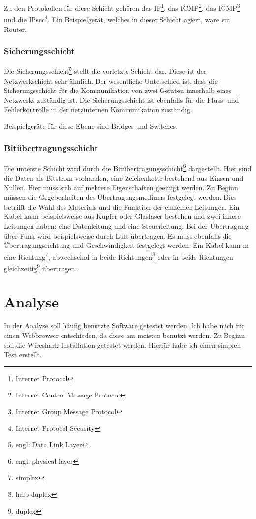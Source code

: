 \documentclass[12pt]{article}
\begin{document}
	Zu den Protokollen für diese Schicht gehören das IP\footnote{Internet Protocol}, das ICMP\footnote{Internet Control Message Protocol}, das IGMP\footnote{Internet Group Message Protocol} und die IPsec\footnote{Internet Protocol Security}. Ein Beispielgerät, welches in dieser Schicht agiert, wäre ein Router.\cite{osi-schichten-cloudflare}\cite{osi-schichten-netzwerkecom}
	
\subsubsection{Sicherungsschicht}
	Die Sicherungsschicht\footnote{engl: Data Link Layer} stellt die vorletzte Schicht dar. Diese ist der Netzwerkschicht sehr ähnlich. Der wesentliche Unterschied ist, dass die Sicherungsschicht für die Kommunikation von zwei Geräten innerhalb eines Netzwerks zuständig ist. Die Sicherungsschicht ist ebenfalls für die Fluss- und Fehlerkontrolle in der netzinternen Kommunikation zuständig. 
	
	Beispielgeräte für diese Ebene sind Bridges und Switches.\cite{osi-schichten-cloudflare}\cite{osi-schichten-netzwerkecom}

\subsubsection{Bitübertragungsschicht}
	Die unterste Schicht wird durch die Bitübertragungsschicht\footnote{engl: physical layer} dargestellt. Hier sind die Daten als Bitstrom vorhanden, eine Zeichenkette bestehend aus Einsen und Nullen. Hier muss sich auf mehrere Eigenschaften geeinigt werden. Zu Beginn müssen die Gegebenheiten des Übertragungsmediums festgelegt werden. Dies betrifft die Wahl des Materials und die Funktion der einzelnen Leitungen. Ein Kabel kann beispielsweise aus Kupfer oder Glasfaser bestehen und zwei innere Leitungen haben: eine Datenleitung und eine Steuerleitung. Bei der Übertragung über Funk wird beispielsweise durch Luft übertragen. Es muss ebenfalls die Übertragungsrichtung und Geschwindigkeit festgelegt werden. Ein Kabel kann in eine Richtung\footnote{simplex}, abwechselnd in beide Richtungen\footnote{halb-duplex} oder in beide Richtungen gleichzeitig\footnote{duplex} übertragen.\cite{osi-schichten-cloudflare}\cite{osi-schichten-netzwerkecom}


\section{Analyse}
In der Analyse soll häufig benutzte Software getestet werden. Ich habe mich für einen Webbrowser entschieden, da diese am meisten benutzt werden.\cite{beliebteste-programme} Zu Beginn soll die Wireshark-Installation getestet werden. Hierfür habe ich einen simplen Test erstellt.
\end{document}
